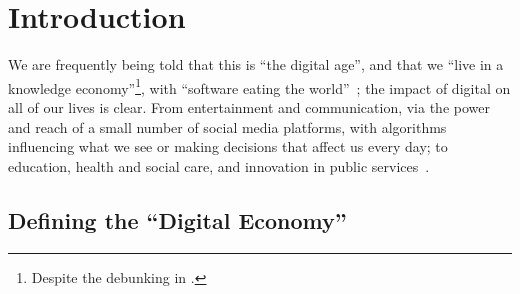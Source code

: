 \documentclass[sigconf,anonymous]{acmart}
\begin{document}

\maketitle


\section{Introduction}


We are frequently being told that this is ``the digital age'', and
that we ``live in a knowledge economy''\footnote{Despite the debunking
in \cite{Friesen2008}.}, with ``software eating the
world''~\cite{andreessen:2011}; the impact of digital on all of our
lives is clear. From entertainment and communication, via the power
and reach of a small number of social media platforms, with algorithms
influencing what we see or making decisions that affect us every day;
to education, health and social care, and innovation in public
services~\cite{ecdsmsuk:2018}.

\subsection{Defining the ``Digital Economy''}
\end{document}
